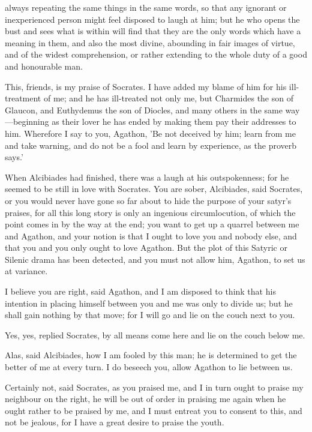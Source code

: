 always repeating the same things in the same words, so that any ignorant or inexperienced person might feel disposed to laugh at him; but he who opens the bust and sees what is within will find that they are the only words which have a meaning in them, and also the most divine, abounding in fair images of virtue, and of the widest comprehension, or rather extending to the whole duty of a good and honourable man.

\para[154] This, friends, is my praise of Socrates. I have added my blame of him for his ill-treatment of me; and he has ill-treated not only me, but Charmides the son of Glaucon, and Euthydemus the son of Diocles, and many others in the same way---beginning as their lover he has ended by making them pay their addresses to him. Wherefore I say to you, Agathon, 'Be not deceived by him; learn from me and take warning, and do not be a fool and learn by experience, as the proverb says.'

\para[155] When Alcibiades had finished, there was a laugh at his outspokenness; for he seemed to be still in love with Socrates. You are sober, Alcibiades, said Socrates, or you would never have gone so far about to hide the purpose of your satyr's praises, for all this long story is only an ingenious circumlocution, of which the point comes in by the way at the end; you want to get up a quarrel between me and Agathon, and your notion is that I ought to love you and nobody else, and that you and you only ought to love Agathon. But the plot of this Satyric or Silenic drama has been detected, and you must not allow him, Agathon, to set us at variance.

\para[156] I believe you are right, said Agathon, and I am disposed to think that his intention in placing himself between you and me was only to divide us; but he shall gain nothing by that move; for I will go and lie on the couch next to you.

\para[157] Yes, yes, replied Socrates, by all means come here and lie on the couch below me.

\para[158] Alas, said Alcibiades, how I am fooled by this man; he is determined to get the better of me at every turn. I do beseech you, allow Agathon to lie between us.

\para[159] Certainly not, said Socrates, as you praised me, and I in turn ought to praise my neighbour on the right, he will be out of order in praising me again when he ought rather to be praised by me, and I must entreat you to consent to this, and not be jealous, for I have a great desire to praise the youth.

